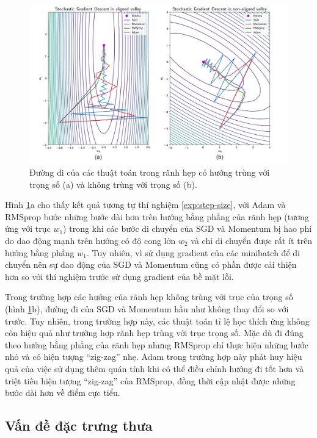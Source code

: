\begin{figure}[htp]
	\centering
	\includegraphics[width=140 mm]{images/aligned-nonaligned.png}
	\caption{Đường đi của các thuật toán trong rãnh hẹp có hướng trùng với trọng số (a) và không trùng với trọng số (b).}
	\label{fig:aligned-nonaligned}
\end{figure}

Hình \ref{fig:aligned-nonaligned}a cho thấy kết quả tương tự thí nghiệm \ref{exp:step-size}, với Adam và RMSprop bước những bước dài hơn trên hướng bằng phẳng của rãnh hẹp (tương ứng với trục $w_1$) trong khi các bước di chuyển của SGD và Momentum bị hao phí do dao động mạnh trên hướng có độ cong lớn $w_2$ và chỉ di chuyển được rất ít trên hướng bằng phẳng $w_1$. Tuy nhiên, vì sử dụng gradient của các minibatch để di chuyển nên sự dao động của SGD và Momentum cũng có phần được cải thiện hơn so với thí nghiệm trước sử dụng gradient của bề mặt lỗi.

Trong trường hợp các hướng của rãnh hẹp không trùng với trục của trọng số (hình \ref{fig:aligned-nonaligned}b), đường đi của SGD và Momentum hầu như không thay đổi so với trước. Tuy nhiên, trong trường hợp này, các thuật toán tỉ lệ học thích ứng không còn hiệu quả như trường hợp rãnh hẹp trùng với trục trọng số. Mặc dù đi đúng theo hướng bằng phẳng của rãnh hẹp nhưng RMSprop chỉ thực hiện những bước nhỏ và có hiện tượng ``zig-zag'' nhẹ. Adam trong trường hợp này phát huy hiệu quả của việc sử dụng thêm quán tính khi có thể điều chỉnh hướng đi tốt hơn và triệt tiêu hiện tượng ``zig-zag'' của RMSprop, đồng thời cập nhật được những bước dài hơn về điểm cực tiểu.

\subsection{Vấn đề đặc trưng thưa}
\label{exp:sparse-noisy}

